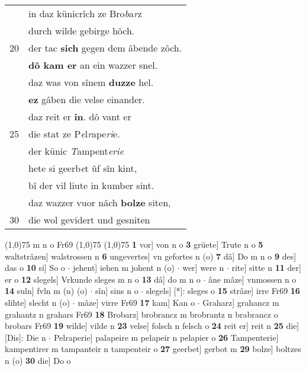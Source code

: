 \documentclass[8pt,a4paper,notitlepage]{article}
\begin{document}
\begin{table}[ht]
\begin{minipage}[t]{0.5\linewidth}
\begin{tabular}{rl}
 & in daz künicrîch ze Bro\textit{b}a\textit{r}z\\ 
 & durch wilde gebirge hôch.\\ 
20 & der tac \textbf{sich} gegen dem âbende zôch.\\ 
 & \textbf{dô kam er} an ein wazzer snel.\\ 
 & daz was von sînem \textbf{duzze} hel.\\ 
 & \textbf{ez} gâben die velse einander.\\ 
 & daz reit er \textbf{in}. dô vant er\\ 
25 & die stat ze P\textit{e}l\textit{r}ape\textit{ri}e.\\ 
 & der künic \textit{T}ampent\textit{erie}\\ 
 & hete si geerb\textit{e}t ûf sîn kint,\\ 
 & bî der vil liute in kumber sint.\\ 
 & daz wazzer vuor nâch \textbf{bolze} siten,\\ 
30 & die wol gevidert und gesniten\\ 
\end{tabular}
\scriptsize
\line(1,0){75} \newline
m n o Fr69 \newline
\line(1,0){75} \newline
\newline
\line(1,0){75} \newline
\textbf{1} vor] von n o \textbf{3} grüete] Trute n o \textbf{5} waltstrâzen] walstrossen n \textbf{6} ungevertes] vn gefortes n (o) \textbf{7} dâ] Do m n o \textbf{9} des] das o \textbf{10} si] So o  $\cdot$ jehent] iehen m johent n (o)  $\cdot$ wer] were n  $\cdot$ rite] sitte n \textbf{11} der] er o \textbf{12} slegels] Vrkunde sleges m n o \textbf{13} dâ] do m n o  $\cdot$ âne mâze] vnmossen n o \textbf{14} suln] fvln m (n) (o)  $\cdot$ sîn] sins n o  $\cdot$ slegels] [*]: sleges o \textbf{15} strâze] irre Fr69 \textbf{16} slihte] slecht n (o)  $\cdot$ mâze] virre Fr69 \textbf{17} kam] Kan o  $\cdot$ Graharz] grahancz m grahantz n grahars Fr69 \textbf{18} Brobarz] brobrancz m brobrantz n brabrancz o brobars Fr69 \textbf{19} wilde] vilde n \textbf{23} velse] folsch n felsch o \textbf{24} reit er] reit n \textbf{25} die] [Dis]: Die n  $\cdot$ Pelraperie] palapeire m pelapeir n pelapier o \textbf{26} Tampenterie] kampentirer m tampanteir n tampenteir o \textbf{27} geerbet] gerbot m \textbf{29} bolze] boltzes n (o) \textbf{30} die] Do o \newline
\end{minipage}
\end{table}
\end{document}
